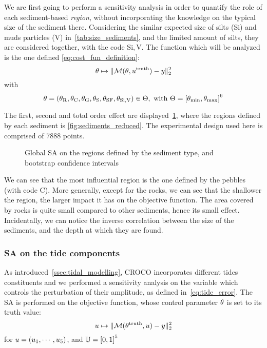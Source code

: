\documentclass[../../Main_ManuscritThese.tex]{subfiles}
\newcommand{\CROCO}{CROCO}
\newcommand\imgpath{/home/victor/acadwriting/Manuscrit/Text/Chapter5/img/}
\begin{document}
We are first going to perform a sensitivity analysis in order to
quantify the role of each sediment-based \emph{region}, without
incorporating the knowledge on the typical size of the sediment there.
Considering the similar expected size of silts (Si) and muds particles
(V) in~\cref{tab:size_sediments}, and the limited amount of silts,
they are considered together, with the code $\mathrm{Si,V}$.
The function which will be analyzed is the one defined
\cref{eq:cost_fun_definition}:
\begin{equation}
\theta \mapsto \|\mathcal{M}(\theta, u^{\mathrm{truth}}) - y \|_2^2
\end{equation}
with
\begin{equation}
  \kk = (\kk_{\mathrm{R}},\kk_{\mathrm{C}},\kk_{\mathrm{G}},\kk_{\mathrm{S}},
  \kk_{\mathrm{SF}},\kk_{\mathrm{Si,V}})\in\Kspace, \text{ with }
  \Kspace = \interval{\kk_{\min}}{\kk_{\max}}^6
\end{equation}

The first, second and total order effect are
displayed~\cref{fig:SA_sediments}, where the regions defined by each
sediment is \cref{fig:sediments_reduced}. The experimental design used
here is comprised of \num{7888} points.

\label{ssec:SA_sediments}
\begin{figure}[ht]
  \centering
  
  \caption{\label{fig:SA_sediments} Global SA on the regions defined by the sediment type, and bootstrap confidence intervals}
\end{figure}

We can see that the most influential region is the one defined by the
pebbles (with code C). More generally, except for the rocks, we can
see that the shallower the region, the larger impact it has on the
objective function. The area covered by rocks is quite small compared
to other sediments, hence its small effect. Incidentally, we can
notice the inverse correlation between the size of the sediments, and
the depth at which they are found.


\subsubsection{SA on the tide components}
\label{ssec:SA_tide}
As introduced~\cref{ssec:tidal_modelling}, \CROCO{} incorporates
different tides constituents and we performed a sensitivity analysis
on the variable which controls the perturbation of their amplitude, as
defined in~\cref{eq:tide_error}. The SA is performed on the objective function, whose control parameter $\theta$ is set to its truth value:
\begin{equation}
  u \mapsto  \| \mathcal{M}(\theta^{\mathrm{truth}}, u) - y \|_2^2
\end{equation}
for $u = (u_1,\cdots,u_5)$, and $\Uspace = \interval{0}{1}^5$
\end{document}
